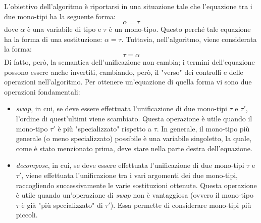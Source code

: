 \documentclass[10pt,a4paper]{article}
\begin{document}
L'obiettivo dell'algoritmo è riportarsi in una situazione tale che l'equazione tra i due mono-tipi ha la seguente forma:
\[ \alpha = \tau \]
dove $ \alpha $ è una variabile di tipo e $ \tau $ è un mono-tipo. Questo perché tale equazione ha la forma di una
sostituzione: $ \alpha = \tau $.
Tuttavia, nell'algoritmo, viene considerata la forma:
\[ \tau = \alpha \]
Di fatto, però, la semantica dell'unificazione non cambia; i termini dell'equazione possono essere anche invertiti,
cambiando, però, il "verso" dei controlli e delle operazioni nell'algoritmo.
Per ottenere un'equazione di quella forma vi sono due operazioni fondamentali:
\begin{itemize}
    \item \textit{swap}, in cui, se deve essere effettuata l'unificazione di due mono-tipi $ \tau $ e $ \tau' $,
    l'ordine di quest'ultimi viene scambiato. Questa operazione è utile quando il mono-tipo $ \tau' $ è più
    "specializzato" rispetto a $ \tau $. In generale, il mono-tipo più generale (o meno specializzato) possibile
    è una variabile singoletto, la quale, come è stato menzionato prima, deve stare nella parte destra dell'equazione.
    \item \textit{decompose}, in cui, se deve essere effettuata l'unificazione di due mono-tipi $ \tau $ e $ \tau' $,
    viene effettuata l'unificazione tra i vari argomenti dei due mono-tipi, raccogliendo successivamente le
    varie sostituzioni ottenute. Questa operazione è utile quando un'operazione di \textit{swap} non è vantaggiosa (ovvero
    il mono-tipo $ \tau $ è già "più specializzato" di $ \tau' $). Essa permette di considerare mono-tipi più piccoli.
\end{itemize}
\end{document}
